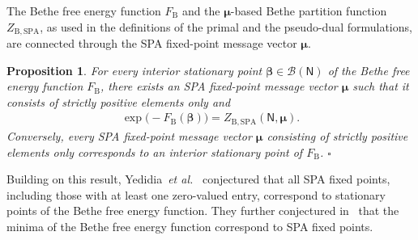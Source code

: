 \documentclass[journal]{IEEEtran}
\newcommand{\add}[1]{{\color{black}#1}}
\newtheorem{proposition}[theorem]{Proposition}
\newcommand{\manualendsymbol}[1]{%
  \leavevmode\unskip\penalty9999\hbox{}\nobreak\hfill
  \quad\hbox{#1}}
\newcommand{\eproposition}{\manualendsymbol{\ensuremath{\square}}}
\newcommand{\vect}[1]{ \bm{#1} }
\newcommand{\set}[1]{\mathcal{#1}}
\newcommand{\beli}{\beta}
\newcommand{\vbeli}{ \vect{\beli} }
\newcommand{\FB}{F_{ \mathrm{B} }}
\newcommand{\vmu}{ \vect{ \mu } }
\newcommand{\graphN}{ \mathsf{N} }
\newcommand{\LMP}{ \set{B} }
\newcommand{\ZBSPA}{ Z_{\mathrm{B,SPA}} }
\newcommand*{\etal}{\textit{et al.}}
\begin{document}
The Bethe free energy function $ \FB $ and the $\vmu$-based Bethe partition
function $ \ZBSPA $, as used in the definitions of the primal and the
pseudo-dual formulations, are connected through the SPA fixed-point message
vector $ \vmu $.

\begin{proposition}\!\cite[Theorem 2]{Yedidia2005} For every interior
  stationary point $ \vbeli{} \in \LMP(\graphN) $ of the Bethe free energy
  function $ \FB $, there exists an SPA fixed-point message vector $ \vmu $
  such that it consists of strictly positive elements only and
  \begin{align*}
    \exp \bigl( -\FB(\vbeli) \bigr) = \ZBSPA(\graphN,\vmu).
  \end{align*}
  Conversely, every SPA fixed-point message vector $ \vmu $ consisting of
  strictly positive elements only corresponds to an interior stationary point
  of $ \FB $.  \eproposition
\end{proposition}

\add{Building on this result, Yedidia~\etal~\cite[Conjecture 1]{Yedidia2005}
  conjectured that all SPA fixed points, including those with at least one
  zero-valued entry, correspond to stationary points of the Bethe free energy
  function. They further conjectured in~\cite[Conjecture 2]{Yedidia2005} that
  the minima of the Bethe free energy function correspond to SPA fixed
  points.}
\end{document}
